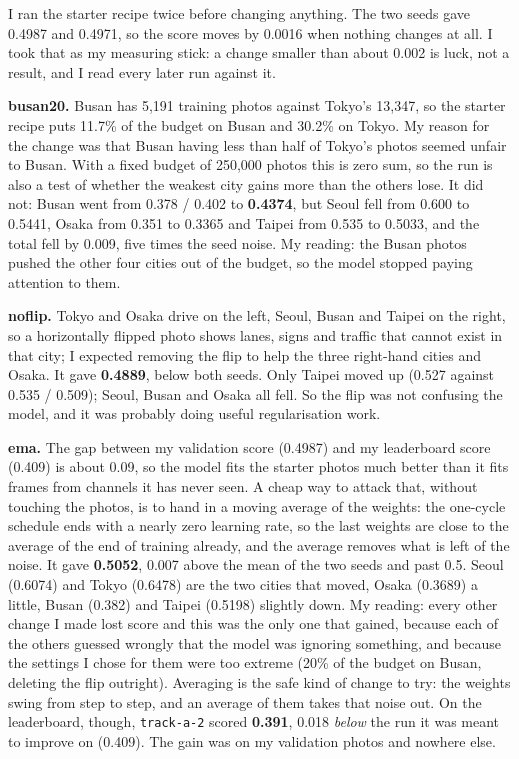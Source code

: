 \documentclass[11pt]{article}
\begin{document}
I ran the starter recipe twice before changing anything. The two seeds gave
0.4987 and 0.4971, so the score moves by 0.0016 when nothing changes at all.
I took that as my measuring stick: a change smaller than about 0.002 is luck,
not a result, and I read every later run against it.

\textbf{busan20.} Busan has 5,191 training photos against Tokyo's 13,347, so
the starter recipe puts 11.7\% of the budget on Busan and 30.2\% on Tokyo. My
reason for the change was that Busan having less than half of Tokyo's photos
seemed unfair to Busan. With a fixed budget of 250,000 photos this is zero
sum, so the run is also a test of whether the weakest city gains more than the
others lose. It did not: Busan went from 0.378 / 0.402 to \textbf{0.4374}, but
Seoul fell from 0.600 to 0.5441, Osaka from 0.351 to 0.3365 and Taipei from
0.535 to 0.5033, and the total fell by 0.009, five times the seed noise. My
reading: the Busan photos pushed the other four cities out of the budget, so
the model stopped paying attention to them.

\textbf{noflip.} Tokyo and Osaka drive on the left, Seoul, Busan and Taipei on
the right, so a horizontally flipped photo shows lanes, signs and traffic that
cannot exist in that city; I expected removing the flip to help the three
right-hand cities and Osaka. It gave \textbf{0.4889}, below both seeds. Only
Taipei moved up (0.527 against 0.535 / 0.509); Seoul, Busan and Osaka all fell.
So the flip was not confusing the model, and it was probably doing useful
regularisation work.

\textbf{ema.} The gap between my validation score (0.4987) and my leaderboard
score (0.409) is about 0.09, so the model fits the starter photos much better
than it fits frames from channels it has never seen. A cheap way to attack
that, without touching the photos, is to hand in a moving average of the
weights: the one-cycle schedule ends with a nearly zero learning rate, so the
last weights are close to the average of the end of training already, and the
average removes what is left of the noise. It gave \textbf{0.5052}, 0.007
above the mean of the two seeds and past 0.5. Seoul (0.6074) and Tokyo (0.6478)
are the two cities that moved, Osaka (0.3689) a little, Busan (0.382) and
Taipei (0.5198) slightly down. My reading: every other change I made lost
score and this was the only one that gained, because each of the others
guessed wrongly that the model was ignoring something, and because the
settings I chose for them were too extreme (20\% of the budget on Busan,
deleting the flip outright). Averaging is the safe kind of change to try: the
weights swing from step to step, and an average of them takes that noise out.
On the leaderboard, though, \texttt{track-a-2} scored \textbf{0.391}, 0.018
\emph{below} the run it was meant to improve on (0.409). The gain was on my
validation photos and nowhere else.
\end{document}
